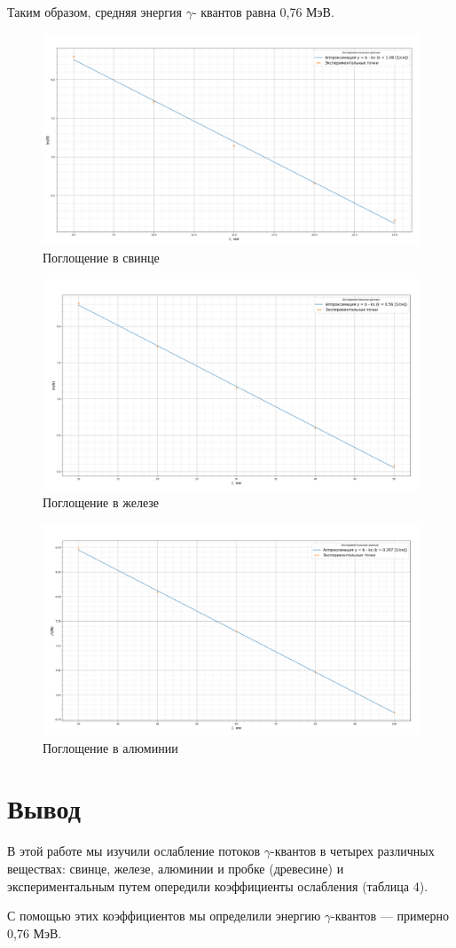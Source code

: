 \documentclass[a4paper,12pt]{article} %
\newcommand{\ga}{\ensuremath{\gamma}}
\begin{document}
	Таким образом, средняя энергия \ga - квантов равна 0,76 МэВ.
	\begin{figure}[H]
		\centering
		\includegraphics[width=0.8\linewidth]{graph_1}
		\caption{Поглощение в свинце}
		\label{fig:graph1}
	\end{figure}
	
	\begin{figure}[H]
		\centering
		\includegraphics[width=0.8\linewidth]{graph_2}
		\caption{Поглощение в железе}
		\label{fig:graph2}
	\end{figure}
	\begin{figure}[H]
		\centering
		\includegraphics[width=0.8\linewidth]{graph_3}
		\caption{Поглощение в алюминии}
		\label{fig:graph3}
	\end{figure}
	
	\section{Вывод}
	
	В этой работе мы изучили ослабление потоков \ga-квантов в четырех различных веществах: свинце, железе, алюминии и пробке (древесине) и экспериментальным путем опередили коэффициенты ослабления (таблица 4). 
	
	С помощью этих коэффициентов мы определили энергию \ga-квантов --- примерно 0,76 МэВ.
\end{document}

